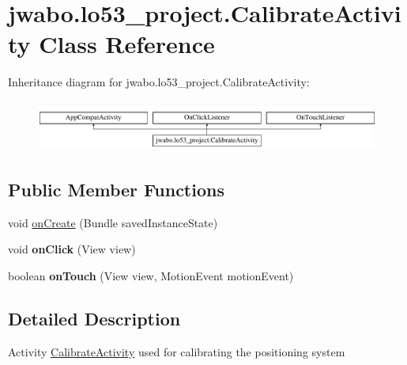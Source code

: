 \hypertarget{classjwabo_1_1lo53__project_1_1_calibrate_activity}{}\section{jwabo.\+lo53\+\_\+project.\+Calibrate\+Activity Class Reference}
\label{classjwabo_1_1lo53__project_1_1_calibrate_activity}
Inheritance diagram for jwabo.\+lo53\+\_\+project.\+Calibrate\+Activity\+:\begin{figure}[H]
\begin{center}
\leavevmode
\includegraphics[height=1.666667cm]{classjwabo_1_1lo53__project_1_1_calibrate_activity}
\end{center}
\end{figure}
\subsection*{Public Member Functions}
\begin{DoxyCompactItemize}
\item 
void \hyperlink{classjwabo_1_1lo53__project_1_1_calibrate_activity_adfec3fba76931e7d6081486441207535}{on\+Create} (Bundle saved\+Instance\+State)
\item 
void {\bfseries on\+Click} (View view)\hypertarget{classjwabo_1_1lo53__project_1_1_calibrate_activity_ac579359bd471e55501bfe0ab39453548}{}\label{classjwabo_1_1lo53__project_1_1_calibrate_activity_ac579359bd471e55501bfe0ab39453548}

\item 
boolean {\bfseries on\+Touch} (View view, Motion\+Event motion\+Event)\hypertarget{classjwabo_1_1lo53__project_1_1_calibrate_activity_a18c4b7134a6901af9633258b521381c1}{}\label{classjwabo_1_1lo53__project_1_1_calibrate_activity_a18c4b7134a6901af9633258b521381c1}

\end{DoxyCompactItemize}


\subsection{Detailed Description}
Activity \hyperlink{classjwabo_1_1lo53__project_1_1_calibrate_activity}{Calibrate\+Activity} used for calibrating the positioning system 

